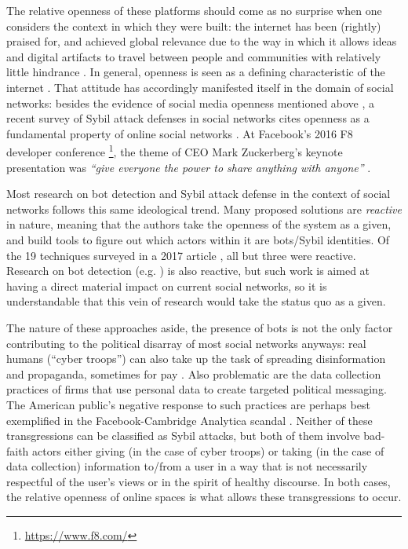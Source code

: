 \documentclass[sigconf,authordraft]{acmart}
\begin{document}
The relative openness of these platforms should come as no surprise when one considers the context in which they were built: the internet has been (rightly) praised for, and achieved global relevance due to the way in which it allows ideas and digital artifacts to travel between people and communities with relatively little hindrance \cite{box2016internet, box2016economic}. In general, openness is seen as a defining characteristic of the internet \cite{bechmann2014ubiquitous, lessig2002future, daigle2015nature}. That attitude has accordingly manifested itself in the domain of social networks: besides the evidence of social media openness mentioned above \cite{rashtian2014befriend, park2009being}, a recent survey of Sybil attack defenses in social networks cites openness as a fundamental property of online social networks \cite{al2017sybil}. At Facebook's 2016 F8 developer conference \footnote{\url{https://www.f8.com/}}, the theme of CEO Mark Zuckerberg's keynote presentation was {\itshape ``give everyone the power to share anything with anyone'' }\cite{USAtoday_F8_keynote_sharequote}. 

Most research on bot detection and Sybil attack defense in the context of social networks follows this same ideological trend. Many proposed solutions are {\itshape reactive} in nature, meaning that the authors take the openness of the system as a given, and build tools to figure out which actors within it are bots/Sybil identities. Of the 19 techniques surveyed in a 2017 article \cite{al2017sybil}, all but three \cite{yu2006sybilguard,yu2008sybillimit,Tran2011Gatekeeper} were reactive. Research on bot detection (e.g. \cite{davis2016botornot}) is also reactive, but such work is aimed at having a direct material impact on current social networks, so it is understandable that this vein of research would take the status quo as a given.

 
The nature of these approaches aside, the presence of bots is not the  only factor contributing to the political disarray of most social networks anyways: real humans (``cyber troops'') can also take up the task of spreading disinformation and propaganda, sometimes for pay \cite{bradshaw2017troops}. Also problematic are the data collection practices of firms that use personal data to create targeted political messaging. The American public's negative response to such practices are perhaps best exemplified in the Facebook-Cambridge Analytica scandal \cite{CambridgeAnalyticaNYT}. Neither of these transgressions can be classified as Sybil attacks, but both of them involve bad-faith actors either giving (in the case of cyber troops) or taking (in the case of data collection) information to/from a user in a way that is not necessarily respectful of the user's views or in the spirit of healthy discourse. In both cases, the relative openness of online spaces is what allows these transgressions to occur.
\end{document}
